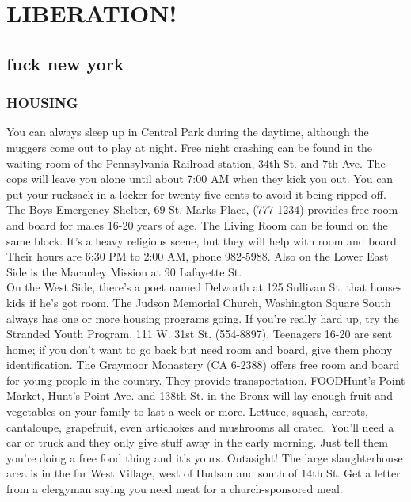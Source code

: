 \documentclass[11pt,twoside,a4paper]{book}
\begin{document}
\clearpage

\chapter{LIBERATION!}

\section{fuck new york}

\subsection{HOUSING}
You can always sleep up in Central Park during the daytime, although the muggers come out to play at night. Free night crashing can be found in the waiting room of the Pennsylvania Railroad station, 34th St. and 7th Ave. The cops will leave you alone until about 7:00 AM when they kick you out. You can put your rucksack in a locker for twenty-five cents to avoid it being ripped-off. The Boys Emergency Shelter, 69 St. Marks Place, (777-1234) provides free room and board for males 16-20 years of age. The Living Room can be found on the same block. It's a heavy religious scene, but they will help with room and board. Their hours are 6:30 PM to 2:00 AM, phone 982-5988. Also on the Lower East Side is the Macauley Mission at 90 Lafayette St.~\\

On the West Side, there's a poet named Delworth at 125 Sullivan St. that houses kids if he's got room. The Judson Memorial Church, Washington Square South always has one or more housing programs going. If you're really hard up, try the Stranded Youth Program, 111 W. 31st St. (554-8897). Teenagers 16-20 are sent home; if you don't want to go back but need room and board, give them phony identification. The Graymoor Monastery (CA 6-2388) offers free room and board for young people in the country. They provide transportation. FOODHunt's Point Market, Hunt's Point Ave. and 138th St. in the Bronx will lay enough fruit and vegetables on your family to last a week or more. Lettuce, squash, carrots, cantaloupe, grapefruit, even artichokes and mushrooms all crated. You'll need a car or truck and they only give stuff away in the early morning. Just tell them you're doing a free food thing and it's yours. Outasight! The large slaughterhouse area is in the far West Village, west of Hudson and south of 14th St. Get a letter from a clergyman saying you need meat for a church-sponsored meal.~\\
\end{document}
